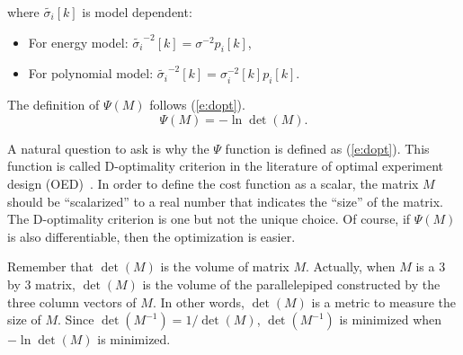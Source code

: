 where $\tilde{\sigma_{i}}[k]$ is model dependent:
\begin{itemize}
\item For energy model: $\tilde{\sigma_{i}}^{-2}[k] = \sigma^{-2} p_{i}[k]$,
\item For polynomial model: $\tilde{\sigma_{i}}^{-2}[k] = \sigma_i^{-2}[k] p_{i}[k]$.
\end{itemize}
The definition of $\Psi(M)$ follows (\ref{e:dopt}).
\begin{equation}\label{e:dopt}
\Psi(M) = -\ln\det(M).
\end{equation}



A natural question to ask is why the $\Psi$ function is defined as (\ref{e:dopt}). This function is called D-optimality criterion in the literature of optimal experiment design (OED)~\cite{EmeryOED98}. In order to define the cost function as a scalar, the matrix $M$ should be ``scalarized'' to a real number that indicates the ``size'' of the matrix. The D-optimality criterion is one but not the unique choice.
Of course, if $\Psi(M)$ is also differentiable, then the optimization is easier.

Remember that $\det(M)$ is the volume of matrix $M$. Actually, when $M$ is a 3 by 3 matrix, $\det(M)$ is the volume of the parallelepiped constructed by the three column vectors of $M$. In other words, $\det(M)$ is a metric to measure the size of $M$. Since $\det(M^{-1})=1/\det(M)$, $\det(M^{-1})$ is minimized when $-\ln\det(M)$ is minimized.

